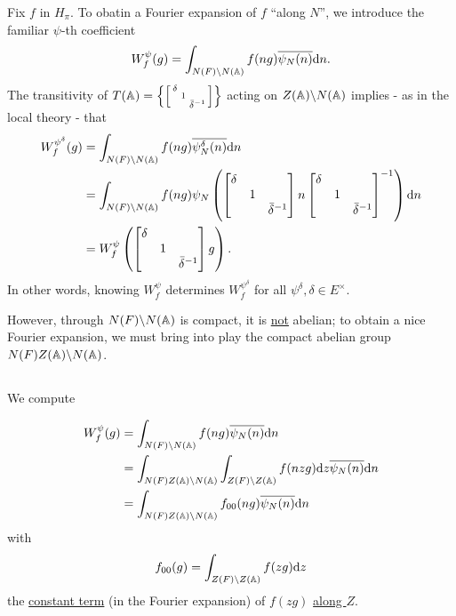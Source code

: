 Fix $f$ in $H_\pi$.
To obatin a Fourier expansion of $f$ ``along $N$'', we introduce the familiar $\psi$-th coefficient
\[
    W_f^\psi(g) = \int_{N(F) \backslash N(\mathbb{A})} f(ng) \overline{\psi_N(n)} \mathrm{d} n.
\]
The transitivity of $T(\mathbb{A}) = \left\{\left[\begin{smallmatrix}\delta & & \\ & 1 & \\ & & \bar\delta^{-1}\end{smallmatrix}\right]\right\}$ acting on $Z(\mathbb{A}) \backslash N(\mathbb{A})$ implies - as in the local theory - that
\begin{align*}
    W_f^{\psi^\delta}(g) &= \int_{N(F) \backslash N(\mathbb{A})} f(ng) \overline{\psi_N^\delta(n)} \mathrm{d} n \\
    &= \int_{N(F) \backslash N(\mathbb{A})} f(ng) \psi_N \left(\begin{bmatrix}
        \delta & & \\ & 1 & \\ & & \bar{\delta}^{-1}
    \end{bmatrix} n\begin{bmatrix}
        \delta & & \\ & 1 & \\ & & \bar{\delta}^{-1}
    \end{bmatrix}^{-1}\right) \mathrm{d} n \\
    &= W_f^{\psi} \left(\begin{bmatrix}
        \delta & & \\ & 1&  \\ & & \bar{\delta}^{-1}
    \end{bmatrix}g\right).
\end{align*}
In other words, knowing $W_f^\psi$ determines $W_f^{\psi^\delta}$ for all $\psi^\delta, \delta \in E^\times$.

However, through $N(F) \backslash N(\mathbb{A})$ is compact, it is \underline{not} abelian; to obtain a nice Fourier expansion, we must bring into play the compact abelian group $N(F) Z(\mathbb{A}) \backslash N(\mathbb{A})$.


\subsection{}
\label{sec:2.2}

We compute

\begin{align*}
    W_f^\psi(g) &= \int_{N(F) \backslash N(\mathbb{A})} f(ng) \overline{\psi_N(n)} \mathrm{d} n \\
    &= \int_{N(F) Z(\mathbb{A}) \backslash N(\mathbb{A})} \int_{Z(F) \backslash Z(\mathbb{A})} f(nzg) \mathrm{d} z \overline{\psi_N(n)}\mathrm{d} n \\
    &= \int_{N(F) Z(\mathbb{A}) \backslash N(\mathbb{A})} f_{00}(ng) \overline{\psi_N(n)} \mathrm{d} n
\end{align*}
with
\begin{equation}
\label{eqn:2.2.1}
    f_{00}(g) = \int_{Z(F) \backslash Z(\mathbb{A})} f(zg) \mathrm{d} z
\end{equation}
the \underline{constant term} (in the Fourier expansion) of $f(zg)$ \underline{along $Z$}.


